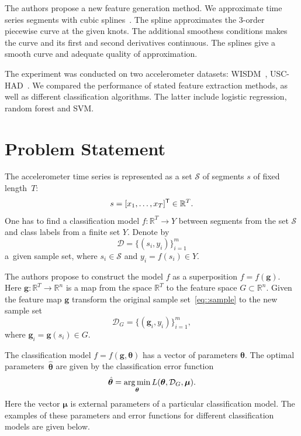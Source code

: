 The authors propose a new feature generation method. 
We approximate time series segments with cubic splines~\cite{deboor1978splines}. 
The spline approximates the 3-order piecewise curve at the given knots. The additional smoothess conditions makes the curve and its first and second derivatives continuous. The splines give a smooth curve and adequate quality of approximation.

The experiment was conducted on two accelerometer datasets: WISDM~\cite{wisdm}, USC-HAD~\cite{usc}. 
We compared the performance of stated feature extraction methods, as well as different classification algorithms. 
The latter include logistic regression, random forest and SVM.

\section{Problem Statement}
The accelerometer time series is represented as a set $\mathcal{S}$ of segments $s$ of fixed length~$T$:
\begin{equation}
s = [x_1, \dots, x_T]^{{\mbox{\scriptsize\sffamily\upshape\mdseries T}}} \in \mathbb{R}^T.
\label{eq::time_series}
\end{equation}
One has to find a classification model $f: \mathbb{R}^T \rightarrow Y$ between segments from the set $\mathcal{S}$ and class labels from a finite set $Y$.
Denote by 
\begin{equation}
\mathcal{D} = \{(s_i, y_i)\}_{i=1}^m
\label{eq::sample}
\end{equation}
a~given sample set, where $s_i \in \mathcal{S}$ and $y_i = f(s_i)\in Y$.

The authors propose to construct the model $f$ as a superposition $f=f(\bm{g})$.
Here $\bm{g}: \mathbb{R}^T \rightarrow \mathbb{R}^n$ is a map from the space $\mathbb{R}^{T} $ to the feature space $G \subset \mathbb{R}^n$.
Given the feature map $\bm{g}$ transform the original sample set~\eqref{eq::sample} to the new sample set
\[
\mathcal{D}_G = \{(\bm{g}_i, y_i)\}_{i=1}^m,
\]
where $\bm{g}_i = \bm{g}(s_i) \in G$. 

The classification model $f=f(\bm{g}, \bm{\theta})$ has a vector of parameters $\boldsymbol{\theta}$. 
The optimal parameters~$\hat{\bm{\theta}}$ are given by the classification error function
\begin{equation}
\hat{\bm{\theta}} = \operatorname*{arg\,min}_{\bm{\theta}} L(\bm{\theta}, \mathcal{D}_G, \bm{\mu}).
\label{eq::optimal_classification_params}
\end{equation}
Here the vector $\bm{\mu}$ is external parameters of a particular classification model. The examples of these parameters and error functions for different classification models are given below.

